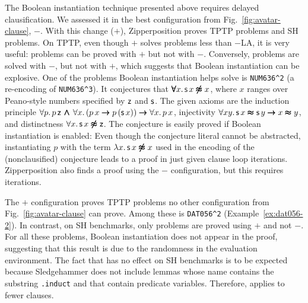 \documentclass[smallcondensed,draft]{svjour3}     %
\begin{document}
The Boolean instantiation technique presented above requires delayed
clausification.
We assessed it in the best configuration from
Fig.~\ref{fig:avatar-clause}, $-$. With this change ($+$),
Zipperposition proves  TPTP problems and  SH
problems.
On TPTP, even though $+$ solves  problems less
than $-$LA, it is very useful: 
problems can be proved with $+$ but not with $-$. 
Conversely,  problems are solved with $-$,
but not with $+$, which suggests that Boolean instantiation can be 
explosive.
%
One of the problems Boolean instantiation helps solve is \texttt{NUM636\^{}2} (a
re-encoding of \texttt{NUM636\^{}3}).
It conjectures that $\pmb\forall x.\, \mathsf{s} \, x \pmb{\not\approx} x$, where $x$ ranges over
Peano-style numbers specified by $\mathsf{z}$ and $\mathsf{s}$. The given axioms are
the induction principle $\forall p.\, p \, \mathsf{z} \,\pmb\land\, \forall x. \, (p \,
x \pmb\rightarrow p \, (\mathsf{s} \, x)) \pmb\rightarrow \forall x. \, p\, x$, injectivity
$\forall x y. \, \mathsf{s}\,x \pmb\approx \mathsf{s}\,y \pmb\rightarrow x \pmb\approx y$, and
distinctness $\forall x. \, \mathsf{s}\,x \pmb{\not\approx} \mathsf{z}$. The conjecture is easily
proved if Boolean instantiation is enabled: Even though the conjecture literal
cannot be abstracted, instantiating $p$ with the term $\lambda x.\, \mathsf{s}
\, x \pmb{\not\approx} x$ used in the encoding of the (nonclausified) conjecture leads to a proof in just
 given clause loop iterations. Zipperposition also finds a
proof using the $-$ configuration, but this requires
 iterations.

The $+$ configuration proves  TPTP problems no other
configuration from Fig.~\ref{fig:avatar-clause} can prove. Among these is
\texttt{DAT056\^{}2} (Example~\ref{ex:dat056-2}). In contrast, on SH benchmarks, only
 problems are proved using $+$ and not
$-$. For all these problems, Boolean instantiation does not
appear in the proof, suggesting that this result is due to the randomness in the
evaluation environment. The fact that  has no effect on SH benchmarks
is to be expected because Sledgehammer does
not include lemmas whose name contains the substring \texttt{.induct} and that
contain predicate variables. Therefore,  applies to fewer clauses.
\end{document}
